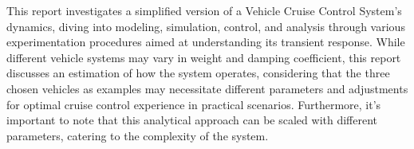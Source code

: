 \documentclass{article}
\begin{document}
This report investigates a simplified version of a Vehicle Cruise Control System's dynamics, diving into modeling, simulation, control, and analysis through various experimentation procedures aimed at understanding its transient response. While different vehicle systems may vary in weight and damping coefficient, this report discusses an estimation of how the system operates, considering that the three chosen vehicles as examples may necessitate different parameters and adjustments for optimal cruise control experience in practical scenarios. Furthermore, it's important to note that this analytical approach can be scaled with different parameters, catering to the complexity of the system.

\newpage
\listoffigures
\listoftables

\newpage
\end{document}
